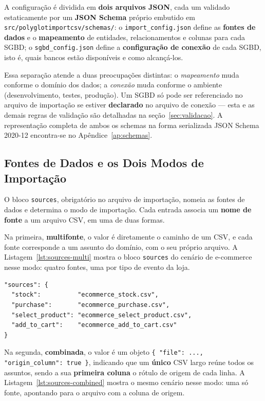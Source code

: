A configuração é dividida em \textbf{dois arquivos JSON}, cada um validado estaticamente
por um \textbf{JSON Schema} próprio embutido em \texttt{src/polyglotimportcsv/schemas/}:
o \texttt{import\_config.json} define as \textbf{fontes de dados} e o \textbf{mapeamento}
de entidades, relacionamentos e colunas para cada SGBD; o \texttt{sgbd\_config.json}
define a \textbf{configuração de conexão} de cada SGBD, isto é, quais bancos estão
disponíveis e como alcançá-los.

Essa separação atende a duas preocupações distintas: o \textit{mapeamento} muda conforme o
domínio dos dados; a \textit{conexão} muda conforme o ambiente (desenvolvimento, testes,
produção). Um SGBD só pode ser referenciado no arquivo de importação se estiver
\textbf{declarado} no arquivo de conexão --- esta e as demais regras de validação são
detalhadas na seção~\ref{sec:validacao}. A representação completa de ambos os schemas na
forma serializada JSON Schema 2020-12 encontra-se no Apêndice~\ref{ap:schemas}.

\subsection{Fontes de Dados e os Dois Modos de Importação}
\label{sec:sources}

O bloco \texttt{sources}, obrigatório no arquivo de importação, nomeia as fontes de dados
e determina o modo de importação. Cada entrada associa um \textbf{nome de fonte} a um
arquivo CSV, em uma de duas formas.

Na primeira, \textbf{multifonte}, o valor é diretamente o caminho de um CSV, e cada fonte
corresponde a um assunto do domínio, com o seu próprio arquivo. A
Listagem~\ref{lst:sources-multi} mostra o bloco \texttt{sources} do cenário de e-commerce
nesse modo: quatro fontes, uma por tipo de evento da loja.

\begin{lstlisting}[style=jsonstyle,caption={Bloco \texttt{sources} no modo multifonte (um CSV por assunto).},label={lst:sources-multi}]
"sources": {
  "stock":          "ecommerce_stock.csv",
  "purchase":       "ecommerce_purchase.csv",
  "select_product": "ecommerce_select_product.csv",
  "add_to_cart":    "ecommerce_add_to_cart.csv"
}
\end{lstlisting}

Na segunda, \textbf{combinada}, o valor é um objeto \texttt{\{ "file": ...,
"origin\_column": true \}}, indicando que um \textbf{único} CSV largo reúne todos os
assuntos, sendo a sua \textbf{primeira coluna} o rótulo de origem de cada linha. A
Listagem~\ref{lst:sources-combined} mostra o mesmo cenário nesse modo: uma só fonte,
apontando para o arquivo com a coluna de origem.

